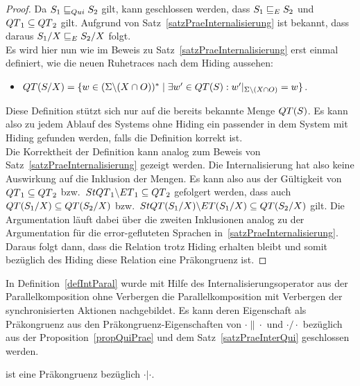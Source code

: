 \begin{proof}
  Da $S_1\sqsubseteq _{Qui} S_2$ gilt, kann geschlossen werden, dass $S_1\sqsubseteq _E S_2$ und
  $QT{}_1\subseteq QT{}_2$ gilt. Aufgrund von
  Satz~\ref{satzPraeInternalisierung} ist bekannt, dass daraus $S_1/X\sqsubseteq _E
  S_2/X$ folgt.\\
  Es wird hier nun wie im Beweis zu Satz~\ref{satzPraeInternalisierung} erst
  einmal definiert, wie die neuen Ruhetraces nach dem Hiding aussehen:
  \begin{itemize}
    \item $QT{}(S/X) = \{w\in (\Sigma\backslash (X\cap O))^*\mid \exists w'\in
      QT{}(S):w'|_{\Sigma\backslash (X\cap O)}=w\}$.
  \end{itemize}
  Diese Definition stützt sich nur auf die bereits bekannte Menge $QT{}(S)$.
  Es kann also zu jedem Ablauf des Systems ohne Hiding ein passender in dem
  System mit Hiding gefunden werden, falls die Definition korrekt ist.\\
  Die Korrektheit der Definition kann analog zum Beweis von
  Satz~\ref{satzPraeInternalisierung} gezeigt werden. Die Internalisierung hat
  also keine Auswirkung auf die Inklusion der Mengen. Es kann also aus der
  Gültigkeit von $QT{}_1\subseteq QT{}_2$ bzw.\ $StQT{}_1\backslash
  ET{}_1\subseteq QT{}_2$ gefolgert werden, dass auch $QT{}(S_1/X)\subseteq
  QT{}(S_2/X)$ bzw.\ $StQT{}(S_1/X)\backslash ET{}(S_1/X)\subseteq
  QT{}(S_2/X)$ gilt. Die Argumentation läuft dabei über die zweiten
  Inklusionen analog zu der Argumentation für die error-gefluteten Sprachen
  in~\ref{satzPraeInternalisierung}.\\
  Daraus folgt dann, dass die Relation \QRel{} trotz Hiding erhalten bleibt und
  somit bezüglich des Hiding diese Relation eine Präkongruenz ist.
\end{proof}

In Definition~\ref{defIntParal} wurde mit Hilfe des Internalisierungsoperator
aus der Parallelkomposition ohne Verbergen die Parallelkomposition mit
Verbergen der synchronisierten Aktionen nachgebildet. Es kann deren
Eigenschaft als Präkongruenz aus den Präkongruenz-Eigenschaften von
$\cdot\|\cdot$ und $\cdot /\cdot$ bezüglich \QRel{} aus der
Proposition~\ref{propQuiPrae} und dem Satz~\ref{satzPraeInterQui} geschlossen
werden.

\begin{kor}
  \QRel{} ist eine Präkongruenz bezüglich $\cdot |\cdot$.
\end{kor}


